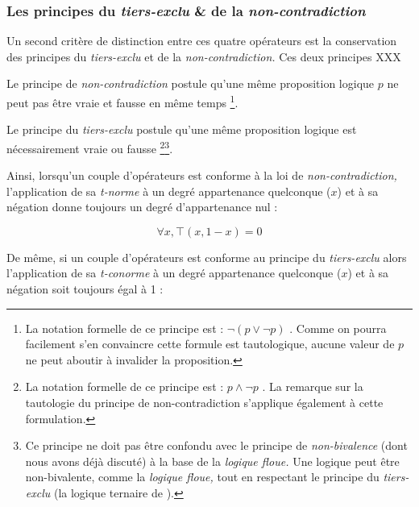 

\subsubsection{Les principes du \emph{tiers-exclu} \& de la
  \emph{non-contradiction}}

Un second critère de distinction entre ces quatre opérateurs est la
conservation des principes du \emph{tiers-exclu} et de la
\emph{non-contradiction.} Ces deux principes XXX

Le principe de \emph{non-contradiction} postule qu'une même
proposition logique \(p\) ne peut pas être vraie et fausse en même
temps \footnote{La notation formelle de ce principe est :
  \(\neg(p \vee \neg p) \) \autocite{Horn2018}. Comme on pourra
  facilement s'en convaincre cette formule est tautologique, aucune
  valeur de \(p\) ne peut aboutir à invalider la proposition.}.


Le principe du \emph{tiers-exclu} postule qu'une même proposition
logique est nécessairement vraie ou fausse \footnote{La notation
  formelle de ce principe est : \(p \wedge \neg p\)
  \autocite{Horn2018}. La remarque sur la tautologie du principe de
  non-contradiction s'applique également à cette
  formulation.}\multiplefootnoteseparator \footnote{Ce principe ne
  doit pas être confondu avec le principe de \emph{non-bivalence}
  (dont nous avons déjà discuté) à la base de la \emph{logique floue.}
  Une logique peut être non-bivalente, comme la \emph{logique floue,}
  tout en respectant le principe du \emph{tiers-exclu} (\eg la logique
  ternaire de ).}.






Ainsi, lorsqu'un couple d'opérateurs est conforme à la loi de
\emph{non-contradiction,} l’application de sa \emph{t-norme} à un
degré appartenance quelconque (\(x\)) et à sa négation donne toujours
un degré d'appartenance nul :

\begin{equation}
  \forall x, ⊤(x,1-x) = 0
\end{equation}

De même, si un couple d'opérateurs est conforme au principe du
\emph{tiers-exclu} alors l’application de sa \emph{t-conorme} à un
degré appartenance quelconque (\(x\))  et à sa négation soit
toujours égal à 1 :

